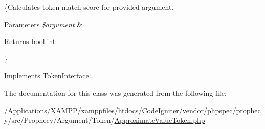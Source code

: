 \{Calculates token match score for provided argument.


\begin{DoxyParams}{Parameters}
{\em \$argument} & \\
\hline
\end{DoxyParams}
\begin{DoxyReturn}{Returns}
bool$\vert$int
\end{DoxyReturn}
\} 

Implements \mbox{\hyperlink{interface_prophecy_1_1_argument_1_1_token_1_1_token_interface_a8d5bf47ab6eaa935458d5ad160e52822}{Token\+Interface}}.



The documentation for this class was generated from the following file\+:\begin{DoxyCompactItemize}
\item 
/\+Applications/\+X\+A\+M\+P\+P/xamppfiles/htdocs/\+Code\+Igniter/vendor/phpspec/prophecy/src/\+Prophecy/\+Argument/\+Token/\mbox{\hyperlink{_approximate_value_token_8php}{Approximate\+Value\+Token.\+php}}\end{DoxyCompactItemize}

